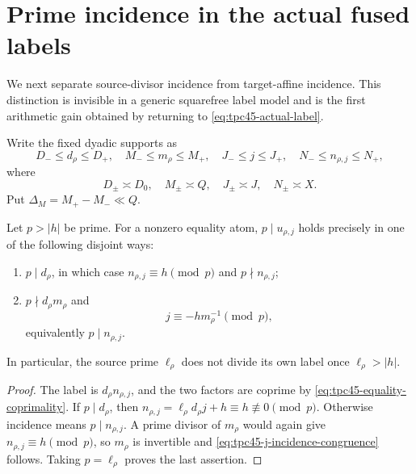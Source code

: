 \section{Prime incidence in the actual fused labels}
\label{sec:tpc45-incidence}

We next separate source-divisor incidence from target-affine incidence.
This distinction is invisible in a generic squarefree label model and
is the first arithmetic gain obtained by returning to
\eqref{eq:tpc45-actual-label}.

Write the fixed dyadic supports as
\begin{equation}
 D_-\le d_\rho\le D_+,
 \quad
 M_-\le m_\rho\le M_+,
 \quad
 J_-\le j\le J_+,
 \quad
 N_-\le n_{\rho,j}\le N_+,
 \label{eq:tpc45-support-endpoints}
\end{equation}
where
\begin{equation}
 D_\pm\asymp D_0,
 \quad M_\pm\asymp Q,
 \quad J_\pm\asymp J,
 \quad N_\pm\asymp X.
 \label{eq:tpc45-support-scales}
\end{equation}
Put \(\Delta_M=M_+-M_-\ll Q\).

\begin{lemma}
\label{lem:tpc45-source-target-incidence}
Let \(p>|h|\) be prime.  For a nonzero equality atom,
\(p\mid u_{\rho,j}\) holds precisely in one of the following disjoint
ways:
\begin{enumerate}[label=(\roman*)]
 \item \(p\mid d_\rho\), in which case
 \(n_{\rho,j}\equiv h\pmod p\) and \(p\nmid n_{\rho,j}\);
 \item \(p\nmid d_\rho m_\rho\) and
 \begin{equation}
  j\equiv-hm_\rho^{-1}\pmod p,
  \label{eq:tpc45-j-incidence-congruence}
 \end{equation}
 equivalently \(p\mid n_{\rho,j}\).
\end{enumerate}
In particular, the source prime \(\ell_\rho\) does not divide its own
label once \(\ell_\rho>|h|\).
\end{lemma}

\begin{proof}
The label is \(d_\rho n_{\rho,j}\), and the two factors are coprime by
\eqref{eq:tpc45-equality-coprimality}.  If \(p\mid d_\rho\), then
\(n_{\rho,j}=\ell_\rho d_\rho j+h\equiv h\not\equiv0\pmod p\).
Otherwise incidence means \(p\mid n_{\rho,j}\).  A prime divisor of
\(m_\rho\) would again give \(n_{\rho,j}\equiv h\pmod p\), so
\(m_\rho\) is invertible and
\eqref{eq:tpc45-j-incidence-congruence} follows.  Taking
\(p=\ell_\rho\) proves the last assertion.
\end{proof}

